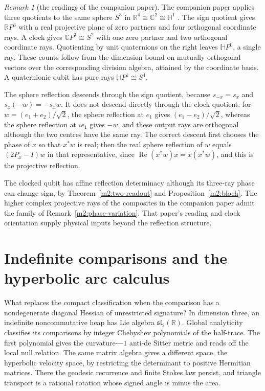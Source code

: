\documentclass[11pt,reqno]{amsart}
\theoremstyle{definition}
\theoremstyle{remark}
\newtheorem{remark}[theorem]{Remark}
\numberwithin{equation}{section}
\newcommand{\R}{\mathbb{R}}
\newcommand{\C}{\mathbb{C}}
\newcommand{\HH}{\mathbb{H}}
\newcommand{\re}{\operatorname{Re}}
\begin{document}
\begin{remark}[the readings of the companion paper]\label{m2:paper2}
The companion paper applies three quotients to the same sphere $S^3$ in $\R^4\cong\C^2\cong\HH^1$ \cite[Thms.~14 and~24]{Companion}.  The
sign quotient gives $\R P^3$ with a real projective plane of zero partners and four orthogonal coordinate rays.  A clock gives
$\C P^1\cong S^2$ with one zero partner and two orthogonal coordinate rays.  Quotienting by unit quaternions on the right leaves $\HH P^0$, a
single ray.  These counts follow from the dimension bound on mutually orthogonal vectors over the corresponding division algebra, attained
by the coordinate basis.  A quaternionic qubit has pure rays $\HH P^1\cong S^4$.

The sphere reflection descends through the sign quotient, because $s_{-x}=s_x$ and $s_x(-w)=-s_xw$.  It does not descend directly through
the clock quotient: for $w=(e_1+e_2)/\sqrt2$, the sphere reflection at $e_1$ gives $(e_1-e_2)/\sqrt2$, whereas the sphere reflection at
$ie_1$ gives $-w$, and these output rays are orthogonal although the two centres have the same ray.  The correct descent first chooses the
phase of $x$ so that $x^*w$ is real; then the real sphere reflection of $w$ equals $(2P_x-I)w$ in that representative, since
$\re(x^*w)x=x(x^*w)$, and this is the projective reflection.

The clocked qubit has affine reflection determinacy although its three-ray phase can change sign, by Theorem~\ref{m2:two-readout} and
Proposition~\ref{m2:bloch}.  The higher complex projective rays of the composites in the companion paper \cite[Thm.~41]{Companion} admit the
family of Remark~\ref{m2:phase-variation}.  That paper's reading and clock orientation supply physical inputs beyond the reflection
structure.
\end{remark}

\section{Indefinite comparisons and the hyperbolic arc calculus}\label{sec:m3}

What replaces the compact classification when the comparison has a
nondegenerate diagonal Hessian of unrestricted signature? In dimension three,
an indefinite noncommutative heap has Lie algebra
\(\mathfrak{sl}_2(\R)\). Global analyticity classifies its comparisons by
integer Chebyshev polynomials of the half-trace. The first polynomial gives
the curvature-\(-1\) anti-de Sitter metric and reads off the local null
relation. The same matrix algebra gives a different space, the hyperbolic
velocity space, by restricting the determinant to positive Hermitian matrices.
There the geodesic recurrence and finite Stokes law persist, and triangle
transport is a rational rotation whose signed angle is minus the area.
\end{document}
